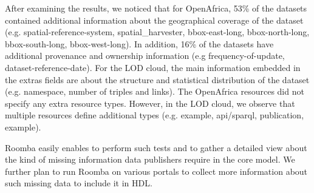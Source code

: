 After examining the results, we noticed that for OpenAfrica, 53\% of the datasets contained additional information about the geographical coverage of the dataset (e.g. spatial-reference-system, spatial\_harvester, bbox-east-long, bbox-north-long, bbox-south-long, bbox-west-long). In addition, 16\% of the datasets have additional provenance and ownership information (e.g frequency-of-update, dataset-reference-date). For the LOD cloud, the main information embedded in the extras fields are about the structure and statistical distribution of the dataset (e.g. namespace, number of triples and links). The OpenAfrica resources did not specify any extra resource types. However, in the LOD cloud, we observe that multiple resources define additional types (e.g. example, api/sparql, publication, example).

Roomba easily enables to perform such tests and to gather a detailed view about the kind of missing information data publishers require in the core model. We further plan to run Roomba on various portals to collect more information about such missing data to include it in HDL.

